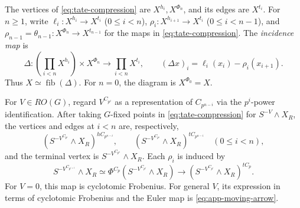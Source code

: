 The vertices of \eqref{eq:tate-compression} are $X^{h_i},X^{\Phi_n}$,
and its edges are $X^{t_i}$. For $n\ge1$, write
$\ell_i:X^{h_i}\to X^{t_i}$ ($0\le i<n$),
$\rho_i:X^{h_{i+1}}\to X^{t_i}$ ($0\le i<n-1$), and
$\rho_{n-1}=\theta_{n-1}:X^{\Phi_n}\to X^{t_{n-1}}$
for the maps in \eqref{eq:tate-compression}. The \emph{incidence map} is
\[
\Delta:\left(\prod_{i<n}X^{h_i}\right)\times X^{\Phi_n}
\longrightarrow\prod_{i<n}X^{t_i},\qquad
(\Delta x)_i=\ell_i(x_i)-\rho_i(x_{i+1}).
\]
Thus $X\simeq\operatorname{fib}(\Delta)$. For $n=0$, the diagram
is $X^{\Phi_0}=X$.

For $V\in RO(G)$, regard $V^{C_{p^i}}$ as a representation
of $C_{p^{n-i}}$ via the $p^i$-power identification. After taking
$G$-fixed points in \eqref{eq:tate-compression} for $S^{-V}\wedge X_R$,
the vertices and edges at $i<n$ are, respectively,
\[
(S^{-V^{C_{p^i}}}\wedge X_R)^{hC_{p^{n-i}}},\qquad
(S^{-V^{C_{p^i}}}\wedge X_R)^{tC_{p^{n-i}}}\quad(0\le i<n),
\]
and the terminal vertex is $S^{-V^{C_{p^n}}}\wedge X_R$. Each $\rho_i$ is induced by
\[
S^{-V^{C_{p^{i+1}}}}\wedge X_R
\simeq\Phi^{C_p}(S^{-V^{C_{p^i}}}\wedge X_R)
\longrightarrow(S^{-V^{C_{p^i}}}\wedge X_R)^{tC_p}.
\]
For $V=0$, this map is cyclotomic Frobenius.
For general $V$, its expression in terms of cyclotomic Frobenius
and the Euler map is \eqref{eq:app-moving-arrow}.

